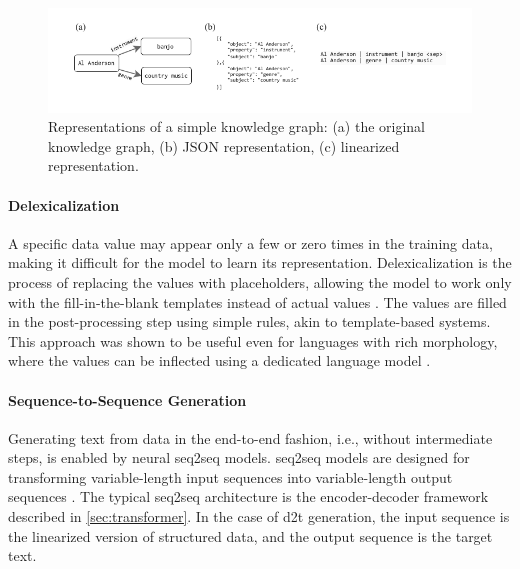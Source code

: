 {\begin{figure}[h]
    \centering
    \includegraphics[width=\textwidth]{img/linearization.pdf}

    \caption[Knowledge graph representations.]{Representations of a simple knowledge graph: (a) the original knowledge graph, (b) JSON representation, (c) linearized representation.}\label{fig:linearization}

\end{figure}

\paragraph{Delexicalization} A specific data value may appear only a few or zero times in the training data, making it difficult for the model to learn its representation. Delexicalization is the process of replacing the values with placeholders, allowing the model to work only with the fill-in-the-blank templates instead of actual values \cite{oh2000stochastic,mairesse2010phrase,wen2015semantically,dusekSequencetoSequenceGenerationSpoken2016}. The values are filled in the post-processing step using simple rules, akin to template-based systems. This approach was shown to be useful even for languages with rich morphology, where the values can be inflected using a dedicated language model \cite{duvsek2019neural}.

\paragraph{Sequence-to-Sequence Generation} Generating text from data in the end-to-end fashion, i.e., without intermediate steps, is enabled by neural \ac{seq2seq} models. \Ac{seq2seq} models are designed for transforming variable-length input sequences into variable-length output sequences \cite{cho2014learning,sutskever2014sequence}. The typical \ac{seq2seq} architecture is the encoder-decoder framework described in \autoref{sec:transformer}. In the case of \ac{d2t} generation, the input sequence is the linearized version of structured data, and the output sequence is the target text.

}

